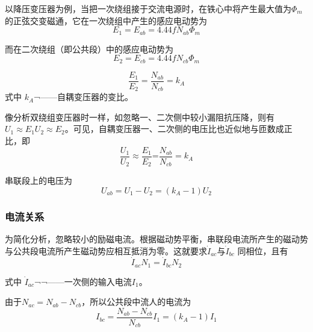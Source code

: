 \documentclass{book}
\begin{document}
以降压变压器为例，当把一次绕组接于交流电源时，在铁心中将产生最大值为${{\Phi }_{m}}$的正弦交变磁通，它在一次绕组中产生的感应电动势为
\begin{equation}
{{E}_{1}}={{E}_{ab}}=4.44f{{N}_{ab}}{{\Phi }_{m}}
\label{5-1}
\end{equation}

而在二次绕组（即公共段）中的感应电动势为
\begin{equation}
{{E}_{2}}={{E}_{cb}}=4.44f{{N}_{cb}}{{\Phi }_{m}}
\label{5-2}
\end{equation}

\begin{equation}
\frac{{{E}_{1}}}{{{E}_{2}}}=\frac{{{N}_{ab}}}{{{N}_{cb}}}={{k}_{A}}
\label{5-3}
\end{equation}
式中  ${{k}_{A}}$¬——自耦变压器的变比。

像分析双绕组变压器时一样，如忽略一、二次侧中较小漏阻抗压降，则有${{U}_{1}}\approx {{E}_{1}}{{U}_{2}}\approx {{E}_{2}}$。可见，自耦变压器一、二次侧的电压比也近似地与匝数成正比，即
\begin{equation}
\frac{{{U}_{1}}}{{{U}_{2}}}\approx \frac{{{E}_{1}}}{{{E}_{2}}}\text{=}\frac{{{N}_{ab}}}{{{N}_{cb}}}={{k}_{A}}
\label{5-4}
\end{equation}

串联段上的电压为
\begin{equation}
{{U}_{ab}}={{U}_{1}}-{{U}_{2}}=\left( {{k}_{A}}-1 \right){{U}_{2}}
\label{5-5}
\end{equation}

\subsubsection{电流关系}

为简化分析，忽略较小的励磁电流。根据磁动势平衡，串联段电流所产生的磁动势与公共段电流所产生磁动势应相互抵消为零。这就要求${{\dot{I}}_{ac}}$与${{\dot{I}}_{bc}}$ 同相位，且有
\begin{equation}
{{\dot{I}}_{ac}}{{N}_{1}}={{\dot{I}}_{bc}}{{N}_{2}}
\label{5-6}
\end{equation}

式中  ${{\dot{I}}_{ac}}$¬¬——一次侧的输入电流${{I}_{1}}$。

由于${{N}_{ac}}={{N}_{ab}}-{{N}_{cb}}$，所以公共段中流人的电流为
\begin{equation}
{{I}_{bc}}=\frac{{{N}_{ab}}-{{N}_{cb}}}{{{N}_{cb}}}{{I}_{1}}=\left( {{k}_{A}}-1 \right){{I}_{1}}
\label{5-7}
\end{equation}
\end{document}
